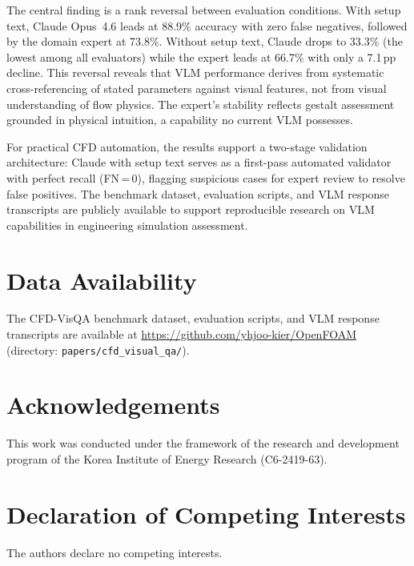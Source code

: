 \documentclass[preprint,12pt]{elsarticle}
\begin{document}
The central finding is a rank reversal between evaluation conditions. With
setup text, Claude Opus~4.6 leads at 88.9\% accuracy with zero false
negatives, followed by the domain expert at 73.8\%. Without setup text,
Claude drops to 33.3\% (the lowest among all evaluators) while the expert
leads at 66.7\% with only a 7.1\,pp decline. This reversal reveals that VLM
performance derives from systematic cross-referencing of stated parameters
against visual features, not from visual understanding of flow physics. The
expert's stability reflects gestalt assessment grounded in physical
intuition, a capability no current VLM possesses.

For practical CFD automation, the results support a two-stage validation
architecture: Claude with setup text serves as a first-pass automated
validator with perfect recall (FN\,=\,0), flagging suspicious cases for
expert review to resolve false positives. The benchmark dataset, evaluation
scripts, and VLM response transcripts are publicly available to support
reproducible research on VLM capabilities in engineering simulation
assessment.


\section*{Data Availability}

The CFD-VisQA benchmark dataset, evaluation scripts, and VLM response
transcripts are available at
\url{https://github.com/yhjoo-kier/OpenFOAM} (directory:
\texttt{papers/cfd\_visual\_qa/}).


\section*{Acknowledgements}

This work was conducted under the framework of the research and development program of the Korea Institute of Energy Research (C6-2419-63).

\section*{Declaration of Competing Interests}

The authors declare no competing interests.




\end{document}
